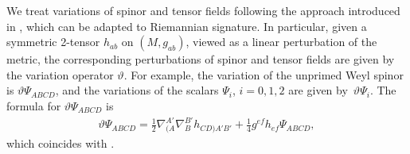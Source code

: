 \documentclass[10pt,a4paper]{amsart}
\numberwithin{equation}{section}
\begin{document}
We treat variations of spinor and tensor fields following the approach introduced in \cite{backdahl2016formalism},
which can be adapted to Riemannian signature.
In particular, given a symmetric 2-tensor $h_{ab}$ on $(M, g_{ab})$, viewed as a linear perturbation of the metric, the corresponding perturbations of spinor and tensor fields are given by the variation operator $\vartheta$. For example, the variation of the unprimed Weyl spinor is $\vartheta \Psi_{ABCD}$, and the variations of the scalars $\Psi_i$, $i=0,1,2$ are given by~$\vartheta \Psi_i$.
The formula for $\vartheta \Psi_{ABCD}$ is
\begin{align}\label{linWeylSpinor}
\vartheta\Psi_{ABCD}
= \frac{1}{2}\nabla_{(A}^{A'}\nabla_{B}^{B'}h_{CD)A'B'} + \frac{1}{4}g^{ef}h_{ef}\Psi_{ABCD},
\end{align}
which coincides with \cite[equation~(5.7.15)]{PR:I}.
\end{document}
